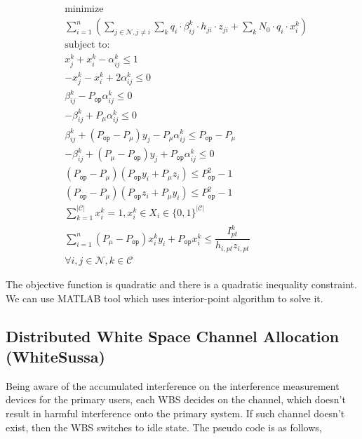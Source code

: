 \documentclass[times]{ettauth}
\theoremstyle{mytheoremstyle}
\theoremstyle{mytheoremstyle}
\theoremstyle{mytheoremstyle}
\begin{document}
			\begin{align}
			\label{scheme2optimizaiton}
			& \underset{}{\text{minimize}}\\
			&\sum\limits^{n}_{i=1}(\sum\limits_{j\in\mathcal{N}, j\neq i}\sum\limits_k q_{i}\cdot \beta_{ij}^k \cdot h_{ji}\cdot z_{ji} + \sum\limits_k N_0\cdot q_{i}\cdot x_i^k)\\
			& \text{subject to:} \\
			& x_j^k + x_i^k - \alpha_{ij}^k\leq 1 \\
			& -x_j^k - x_i^k +2 \alpha_{ij}^k \leq 0 \\
			& \beta_{ij}^k - P_{\mathtt{op}} \alpha_{ij}^k \leq 0 \\
			& - \beta_{ij}^k + P_\mu \alpha_{ij}^k \leq 0 \\
			& \beta_{ij}^k + (P_{\mathtt{op}} - P_\mu)y_j - P_\mu \alpha_{ij}^k \leq P_{\mathtt{op}}- P_\mu \\	
			& -\beta_{ij}^k + (P_\mu - P_{\mathtt{op}})y_j + P_{\mathtt{op}} \alpha_{ij}^k \leq 0 \\					
			& (P_{\mathtt{op}} - P_\mu)(P_{\mathtt{op}} y_i + P_\mu z_i)  \leq P_{\mathtt{op}}^2-1\\
			& (P_{\mathtt{op}} - P_\mu)(P_{\mathtt{op}} z_i + P_\mu y_i)  \leq P_{\mathtt{op}}^2 - 1\\
			& \sum\limits_{k=1}^{|\mathcal{C}|}x_i^k=1, x_i^k\in X_i\in \{0,1\}^{|\mathcal{C}|}\\
			& \sum\limits^{n}_{i=1} (P_\mu - P_{\mathtt{op}})x_i^k y_i + P_{\mathtt{op}}x_i^k \leq  \dfrac{I^k_{pt}}{h_{i,pt} z_{i,pt}}\\
			& \forall i, j\in \mathcal{N}, k\in \mathcal{C}
			\end{align}


The objective function is quadratic and there is a quadratic inequality constraint.
We can use MATLAB tool which uses interior-point algorithm to solve it.

\subsection{Distributed White Space Channel Allocation (WhiteSussa)}
Being aware of the accumulated interference on the interference measurement devices for the primary users, each WBS decides on the channel, which doesn't result in harmful interference onto the primary system.
If such channel doesn't exist, then the WBS switches to idle state.
The pseudo code is as follows,
\end{document}
